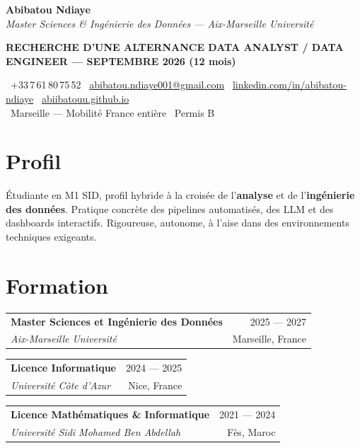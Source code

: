 \documentclass[10pt,a4paper]{article}
\makeatletter
\newcommand{\cventry}[4]{%
  \noindent
  \begin{tabularx}{\linewidth}{@{}X r@{}}
    \textbf{#1} & {\small\color{textlight} #3} \\[1pt]
    \textit{\small #2} & {\small\color{textlight} #4} \\
  \end{tabularx}\par\vspace{1pt}%
}
\makeatother
\begin{document}
\begin{center}
{\fontsize{28}{32}\selectfont\bfseries\color{inkdark} Abibatou Ndiaye}\\[2pt]
{\itshape\color{textmid} Master Sciences \& Ingénierie des Données — Aix-Marseille Université}
\end{center}
\vspace{3pt}

\noindent\colorbox{inkdark}{%
  \parbox{\dimexpr\textwidth-2\fboxsep}{%
    \centering\color{creamlight}\bfseries\small
    RECHERCHE D'UNE ALTERNANCE DATA ANALYST / DATA ENGINEER — SEPTEMBRE 2026 (12 mois)%
  }%
}
\vspace{4pt}

\begin{center}
\small
\faPhone\ +33\,7\,61\,80\,75\,52 \quad{\color{accent}\textbar}\quad
\faEnvelope\ \href{mailto:abibatou.ndiaye001@gmail.com}{abibatou.ndiaye001@gmail.com} \quad{\color{accent}\textbar}\quad
\faLinkedin\ \href{https://linkedin.com/in/abibatou-ndiaye}{linkedin.com/in/abibatou-ndiaye} \quad{\color{accent}\textbar}\quad
\faGlobe\ \href{https://abiibatouu.github.io}{abiibatouu.github.io}\\[1pt]
\faMapMarkerAlt\ Marseille — Mobilité France entière \quad{\color{accent}\textbar}\quad \faCar\ Permis B
\end{center}

\section*{Profil}
Étudiante en M1 SID, profil hybride à la croisée de l'\textbf{analyse} et de l'\textbf{ingénierie des données}. Pratique concrète des pipelines automatisés, des LLM et des dashboards interactifs. Rigoureuse, autonome, à l'aise dans des environnements techniques exigeants.

\section*{Formation}
\cventry{Master Sciences et Ingénierie des Données}{Aix-Marseille Université}{2025 — 2027}{Marseille, France}
\cventry{Licence Informatique}{Université Côte d'Azur}{2024 — 2025}{Nice, France}
\cventry{Licence Mathématiques \& Informatique}{Université Sidi Mohamed Ben Abdellah}{2021 — 2024}{Fès, Maroc}

\end{document}
